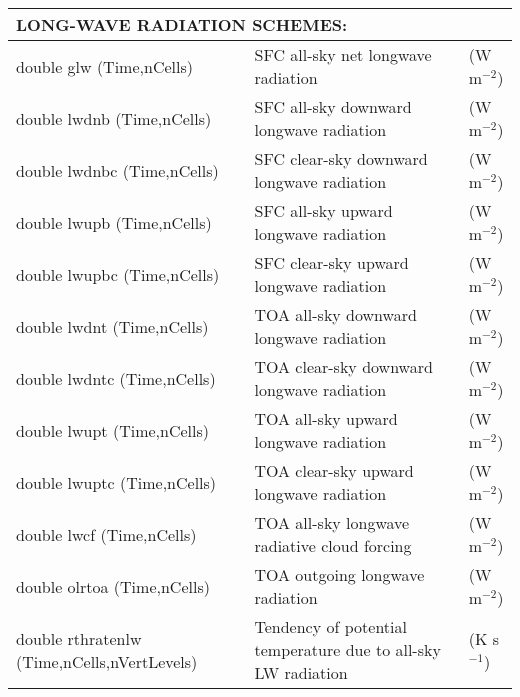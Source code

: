 {\begin{longtable}{|p{2.0in} |p{3.0in} |p{1.0in} |}
\multicolumn{3}{|l|}{{\rule[-3mm]{0mm}{8mm}\bf LONG-WAVE RADIATION SCHEMES:} \hfill}\\ \hline
double glw (Time,nCells)  & SFC all-sky net longwave radiation & (W m$^{-2}$) \\ \hline
double lwdnb (Time,nCells)  & SFC all-sky downward longwave radiation & (W m$^{-2}$) \\ \hline
double lwdnbc (Time,nCells)  & SFC clear-sky downward longwave radiation & (W m$^{-2}$) \\ \hline
double lwupb (Time,nCells)  & SFC all-sky upward longwave radiation & (W m$^{-2}$) \\ \hline
double lwupbc (Time,nCells)  & SFC clear-sky upward longwave radiation & (W m$^{-2}$) \\ \hline
double lwdnt (Time,nCells)  & TOA all-sky downward longwave radiation & (W m$^{-2}$) \\ \hline
double lwdntc (Time,nCells) & TOA clear-sky downward longwave radiation & (W m$^{-2}$) \\ \hline
double lwupt (Time,nCells)  & TOA all-sky upward longwave radiation & (W m$^{-2}$) \\ \hline
double lwuptc (Time,nCells)  & TOA clear-sky upward longwave radiation & (W m$^{-2}$) \\ \hline
double lwcf (Time,nCells)  & TOA all-sky longwave radiative cloud forcing & (W m$^{-2}$) \\ \hline
double olrtoa (Time,nCells) & TOA outgoing longwave radiation & (W m$^{-2}$) \\ \hline 
double rthratenlw \hfil\break (Time,nCells,nVertLevels)  & Tendency of potential temperature due to all-sky LW radiation & (K s$^{-1}$) \\ \hline


\end{longtable}}
